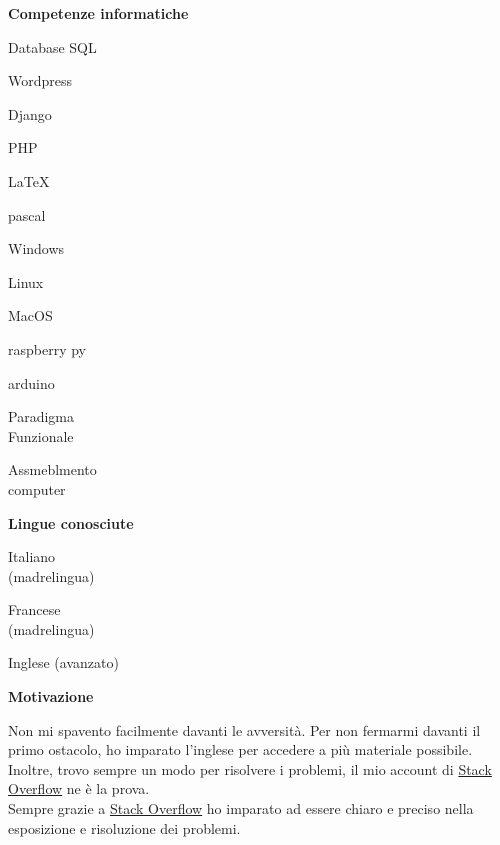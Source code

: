 \documentclass[a4paper,12pt,final]{memoir}
\newcommand{\Sep}{\vspace{1.5em}}
\newcommand{\SmallSep}{\vspace{0.5em}}
\newcommand{\CVSection}[1]
	{\Large\textbf{#1}\par
	\SmallSep\normalsize\normalfont}
\newcommand{\CVItem}[1]
	{\textbf{\color{RoyalBlue} #1}}
\begin{document}
\CVItem{Competenze informatiche}
\begin{multicols}{3}
\begin{compactitem}[\color{RoyalBlue}$\circ$]
	\item Database SQL
	\item Wordpress
	\item Django
	\item PHP
	\item \LaTeX
	\item pascal
	\item Windows
	\item Linux
	\item MacOS
	\item raspberry py
	\item arduino
	\item Paradigma\\Funzionale
	\item Assmeblmento\\computer
\end{compactitem}
\end{multicols}
\SmallSep

\clearpage
\framebreak
\framebreak

\CVItem{Lingue conosciute}
\begin{multicols}{3}
\begin{compactitem}[\color{RoyalBlue}$\circ$]
	\item Italiano\\(madrelingua)
	\item Francese\\(madrelingua)
	\item Inglese (avanzato)
\end{compactitem}
\end{multicols}
\Sep 

\CVSection{Motivazione}
	Non mi spavento facilmente davanti le avversità.
	Per non fermarmi davanti il primo ostacolo, ho imparato l'inglese per accedere a più materiale possibile.
	\\Inoltre, trovo sempre un modo per risolvere i problemi, il mio account di \href{https://stackoverflow.com/users/6875945/mattia-rubini}{Stack Overflow} ne è la prova.
	\\Sempre grazie a \href{https://stackoverflow.com/users/6875945/mattia-rubini}{Stack Overflow} ho imparato ad essere chiaro e preciso nella esposizione e risoluzione dei problemi.
\end{document}
